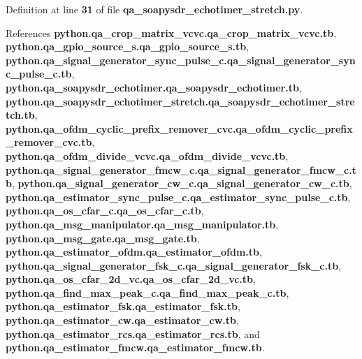 Definition at line {\bf 31} of file {\bf qa\+\_\+soapysdr\+\_\+echotimer\+\_\+stretch.\+py}.



References {\bf python.\+qa\+\_\+crop\+\_\+matrix\+\_\+vcvc.\+qa\+\_\+crop\+\_\+matrix\+\_\+vcvc.\+tb}, {\bf python.\+qa\+\_\+gpio\+\_\+source\+\_\+s.\+qa\+\_\+gpio\+\_\+source\+\_\+s.\+tb}, {\bf python.\+qa\+\_\+signal\+\_\+generator\+\_\+sync\+\_\+pulse\+\_\+c.\+qa\+\_\+signal\+\_\+generator\+\_\+sync\+\_\+pulse\+\_\+c.\+tb}, {\bf python.\+qa\+\_\+soapysdr\+\_\+echotimer.\+qa\+\_\+soapysdr\+\_\+echotimer.\+tb}, {\bf python.\+qa\+\_\+soapysdr\+\_\+echotimer\+\_\+stretch.\+qa\+\_\+soapysdr\+\_\+echotimer\+\_\+stretch.\+tb}, {\bf python.\+qa\+\_\+ofdm\+\_\+cyclic\+\_\+prefix\+\_\+remover\+\_\+cvc.\+qa\+\_\+ofdm\+\_\+cyclic\+\_\+prefix\+\_\+remover\+\_\+cvc.\+tb}, {\bf python.\+qa\+\_\+ofdm\+\_\+divide\+\_\+vcvc.\+qa\+\_\+ofdm\+\_\+divide\+\_\+vcvc.\+tb}, {\bf python.\+qa\+\_\+signal\+\_\+generator\+\_\+fmcw\+\_\+c.\+qa\+\_\+signal\+\_\+generator\+\_\+fmcw\+\_\+c.\+tb}, {\bf python.\+qa\+\_\+signal\+\_\+generator\+\_\+cw\+\_\+c.\+qa\+\_\+signal\+\_\+generator\+\_\+cw\+\_\+c.\+tb}, {\bf python.\+qa\+\_\+estimator\+\_\+sync\+\_\+pulse\+\_\+c.\+qa\+\_\+estimator\+\_\+sync\+\_\+pulse\+\_\+c.\+tb}, {\bf python.\+qa\+\_\+os\+\_\+cfar\+\_\+c.\+qa\+\_\+os\+\_\+cfar\+\_\+c.\+tb}, {\bf python.\+qa\+\_\+msg\+\_\+manipulator.\+qa\+\_\+msg\+\_\+manipulator.\+tb}, {\bf python.\+qa\+\_\+msg\+\_\+gate.\+qa\+\_\+msg\+\_\+gate.\+tb}, {\bf python.\+qa\+\_\+estimator\+\_\+ofdm.\+qa\+\_\+estimator\+\_\+ofdm.\+tb}, {\bf python.\+qa\+\_\+signal\+\_\+generator\+\_\+fsk\+\_\+c.\+qa\+\_\+signal\+\_\+generator\+\_\+fsk\+\_\+c.\+tb}, {\bf python.\+qa\+\_\+os\+\_\+cfar\+\_\+2d\+\_\+vc.\+qa\+\_\+os\+\_\+cfar\+\_\+2d\+\_\+vc.\+tb}, {\bf python.\+qa\+\_\+find\+\_\+max\+\_\+peak\+\_\+c.\+qa\+\_\+find\+\_\+max\+\_\+peak\+\_\+c.\+tb}, {\bf python.\+qa\+\_\+estimator\+\_\+fsk.\+qa\+\_\+estimator\+\_\+fsk.\+tb}, {\bf python.\+qa\+\_\+estimator\+\_\+cw.\+qa\+\_\+estimator\+\_\+cw.\+tb}, {\bf python.\+qa\+\_\+estimator\+\_\+rcs.\+qa\+\_\+estimator\+\_\+rcs.\+tb}, and {\bf python.\+qa\+\_\+estimator\+\_\+fmcw.\+qa\+\_\+estimator\+\_\+fmcw.\+tb}.

